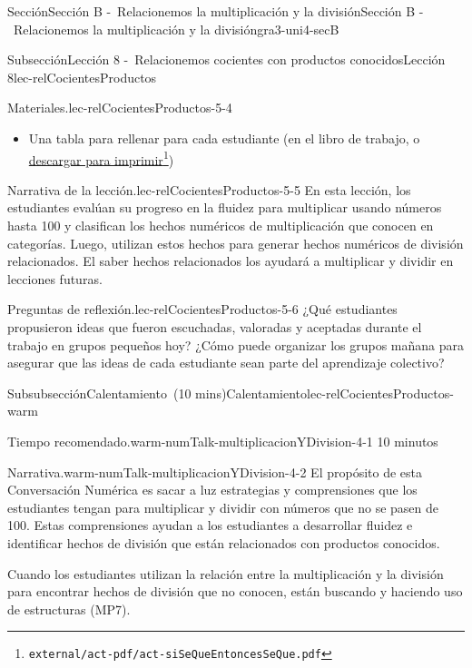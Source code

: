 \documentclass[oneside,10pt,]{article}
\begin{document}
\begin{sectionptx}{Sección}{Sección B -~Relacionemos la multiplicación y la división}{}{Sección B -~Relacionemos la multiplicación y la división}{}{}{gra3-uni4-secB}
\begin{subsectionptx}{Subsección}{Lección 8 -~Relacionemos cocientes con productos conocidos}{}{Lección 8}{}{}{lec-relCocientesProductos}
\begin{introduction}{}
\begin{paragraphs}{Materiales.}{lec-relCocientesProductos-5-4}
\begin{itemize}[label=\textbullet]
\begin{itemize}[label=$\circ$]
\item{}Una tabla para rellenar para cada estudiante (en el libro de trabajo, o \href{external/act-pdf/act-siSeQueEntoncesSeQue.pdf}{descargar para imprimir}\footnote{\nolinkurl{external/act-pdf/act-siSeQueEntoncesSeQue.pdf}\label{lec-relCocientesProductos-5-4-2-2-2-2-2}})%
\end{itemize}
\end{itemize}
\end{paragraphs}%
\begin{paragraphs}{Narrativa de la lección.}{lec-relCocientesProductos-5-5}%
En esta lección, los estudiantes evalúan su progreso en la fluidez para multiplicar usando números hasta 100 y clasifican los hechos numéricos de multiplicación que conocen en categorías. Luego, utilizan estos hechos para generar hechos numéricos de división relacionados. El saber hechos relacionados los ayudará a multiplicar y dividir en lecciones futuras.%
\end{paragraphs}%
\begin{paragraphs}{Preguntas de reflexión.}{lec-relCocientesProductos-5-6}%
¿Qué estudiantes propusieron ideas que fueron escuchadas, valoradas y aceptadas durante el trabajo en grupos pequeños hoy? ¿Cómo puede organizar los grupos mañana para asegurar que las ideas de cada estudiante sean parte del aprendizaje colectivo?%
\end{paragraphs}%
\end{introduction}%
%
%
\typeout{************************************************}
\typeout{************************************************}
%
\begin{subsubsectionptx}{Subsubsección}{Calentamiento~(10 mins)}{}{Calentamiento}{}{}{lec-relCocientesProductos-warm}
\par
\begin{paragraphs}{Tiempo recomendado.}{warm-numTalk-multiplicacionYDivision-4-1}%
10 minutos%
\end{paragraphs}%
\begin{paragraphs}{Narrativa.}{warm-numTalk-multiplicacionYDivision-4-2}%
El propósito de esta Conversación Numérica es sacar a luz estrategias y comprensiones que los estudiantes tengan para multiplicar y dividir con números que no se pasen de 100. Estas comprensiones ayudan a los estudiantes a desarrollar fluidez e identificar hechos de división que están relacionados con productos conocidos.%
\par
Cuando los estudiantes utilizan la relación entre la multiplicación y la división para encontrar hechos de división que no conocen, están buscando y haciendo uso de estructuras (MP7).%

\end{paragraphs}
\end{subsubsectionptx}
\end{subsectionptx}
\end{sectionptx}
\end{document}
